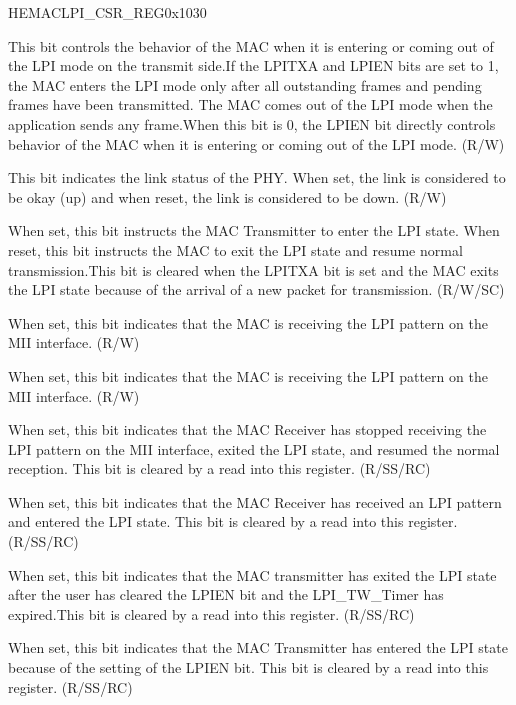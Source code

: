 \begin{register}{H}{EMACLPI\_CSR\_REG}{0x1030}\label{regdesc:EMACLPI_CSRREG}
%
%
%
%
%
%
%
%
%
%
%
%
%
\regnewline%
\begin{regdesc}\begin{reglist}
\item [LPITXA] This bit controls the behavior of the MAC when it is entering or coming out of the LPI mode on the transmit side.If the LPITXA and LPIEN bits are set to 1, the MAC enters the LPI mode only after all outstanding frames and pending frames have been transmitted. The MAC comes out of the LPI mode when the application sends any frame.When this bit is 0, the LPIEN bit directly controls behavior of the MAC when it is entering or coming out of the LPI mode. (R/W)
\item [PLS] This bit indicates the link status of the PHY. When set, the link is considered to be okay (up) and when reset, the link is considered to be down. (R/W)
\item [LPIEN] When set, this bit instructs the MAC Transmitter to enter the LPI state. When reset, this bit instructs the MAC to exit the LPI state and resume normal transmission.This bit is cleared when the LPITXA bit is set and the MAC exits the LPI state because of the arrival of a new packet for transmission. (R/W/SC)
\item [RLPIST] When set, this bit indicates that the MAC is receiving the LPI pattern on the MII interface. (R/W)
\item [TLPIST] When set, this bit indicates that the MAC is receiving the LPI pattern on the MII interface. (R/W)
\item [RLPIEX] When set, this bit indicates that the MAC Receiver has stopped receiving the LPI pattern on the MII interface, exited the LPI state, and resumed the normal reception. This bit is cleared by a read into this register. (R/SS/RC)
\item [RLPIEN] When set, this bit indicates that the MAC Receiver has received an LPI pattern and entered the LPI state. This bit is cleared by a read into this register. (R/SS/RC)
\item [TLPIEX] When set, this bit indicates that the MAC transmitter has exited the LPI state after the user has cleared the LPIEN bit and the LPI\_TW\_Timer has expired.This bit is cleared by a read into this register. (R/SS/RC)
\item [TLPIEN] When set, this bit indicates that the MAC Transmitter has entered the LPI state because of the setting of the LPIEN bit. This bit is cleared by a read into this register. (R/SS/RC)
\end{reglist}\end{regdesc}
\end{register}

